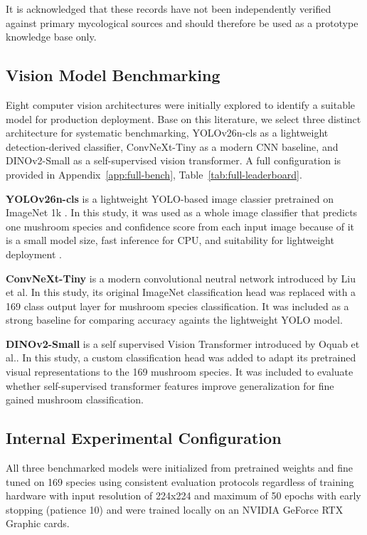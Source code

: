 \documentclass[journal,transmag]{IEEEtran}
\begin{document}
It is acknowledged that these records have not been independently verified against primary mycological sources and should therefore be used as a prototype knowledge base only. 


\subsection{\textbf{Vision Model Benchmarking}}

Eight computer vision architectures were initially explored to identify a suitable model for production deployment. Base on this literature, we select three distinct architecture for systematic benchmarking, YOLOv26n-cls as a lightweight detection-derived  classifier, ConvNeXt-Tiny as a modern CNN baseline, and DINOv2-Small as a self-supervised vision transformer. A full configuration is provided in 
Appendix~\ref{app:full-bench}, 
Table~\ref{tab:full-leaderboard}. 


\textbf{YOLOv26n-cls} is a lightweight YOLO-based image classier pretrained on ImageNet 1k \cite{ultralytics_classify}. In this study, it was used as a whole image classifier that predicts one mushroom species and confidence score from each input image because of it is a small model size, fast inference for CPU, and suitability for lightweight deployment \cite{ultralytics_yolo26}.

\textbf{ConvNeXt-Tiny} is a modern convolutional neutral network introduced by Liu et al\cite{liu2022convnext}. In this study, its original ImageNet classification head was replaced with a 169 class output layer for mushroom species classification. It was included as a strong baseline for comparing accuracy againts the lightweight YOLO model. 

\textbf{DINOv2-Small} is a self supervised Vision Transformer introduced by Oquab et al.\cite{oquab2023dinov2}. In this study, a custom classification head was added to adapt its pretrained visual representations to the 169 mushroom species. It was included to evaluate whether self-supervised transformer features improve generalization for fine gained mushroom classification. 


\subsection{\textbf{Internal Experimental Configuration}}
All three benchmarked models were initialized from pretrained weights and fine tuned on 169 species using consistent evaluation protocols regardless of training hardware with input resolution of 224x224 and maximum of 50 epochs with early stopping (patience 10) and were trained locally on an NVIDIA GeForce RTX Graphic cards. 
\end{document}
